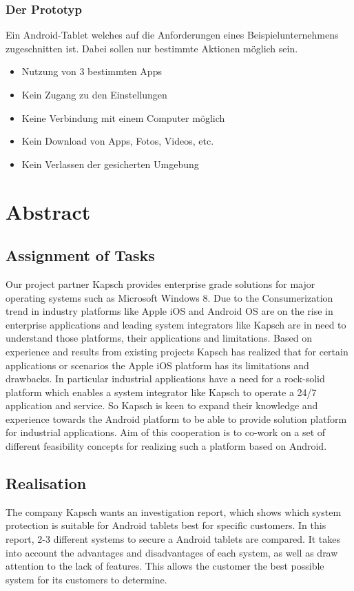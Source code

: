 \subsection*{Der Prototyp}
Ein Android-Tablet welches auf die Anforderungen eines Beispielunternehmens zugeschnitten ist. Dabei sollen nur bestimmte Aktionen möglich sein. 
\begin{itemize}
	\item Nutzung von 3 bestimmten Apps
	\item Kein Zugang zu den Einstellungen
	\item Keine Verbindung mit einem Computer möglich
	\item Kein Download von Apps, Fotos, Videos, etc.
	\item Kein Verlassen der gesicherten Umgebung
\end{itemize}

\newpage

\chapter*{Abstract}
\section*{Assignment of Tasks}
Our project partner Kapsch provides enterprise grade solutions for major operating systems such as Microsoft Windows 8. Due to the Consumerization trend in industry platforms like Apple iOS and Android OS are on the rise in enterprise applications and leading system integrators like Kapsch are in need to understand those platforms, their applications and limitations. Based on experience and results from existing projects Kapsch has realized that for certain applications or scenarios the Apple iOS platform has its limitations and drawbacks. In particular industrial applications have a need for a rock-solid platform which enables a system integrator like Kapsch to operate a 24/7 application and service. So Kapsch is keen to expand their knowledge and experience towards the Android platform to be able to provide solution platform for industrial applications.
Aim of this cooperation is to co-work on a set of different feasibility concepts for realizing such a platform based on Android.
\section*{Realisation}
The company Kapsch wants an investigation report, which shows which system protection is suitable for Android tablets best for specific customers. In this report, 2-3 different systems to secure a Android tablets are compared. It takes into account the advantages and disadvantages of each system, as well as draw attention to the lack of features. This allows the customer the best possible system for its customers to determine.
